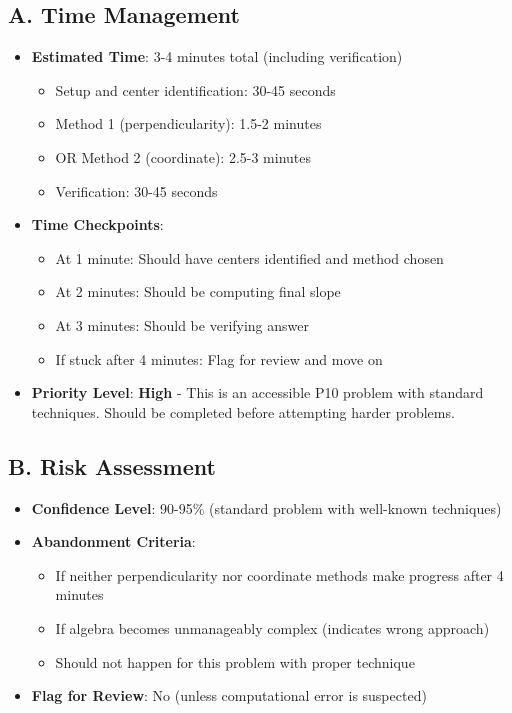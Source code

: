 \documentclass[12pt]{article}
\begin{document}
\begin{competitionbox}
\subsection*{A. Time Management}
\begin{itemize}[leftmargin=*]
    \item \textbf{Estimated Time}: 3-4 minutes total (including verification)
    \begin{itemize}
        \item Setup and center identification: 30-45 seconds
        \item Method 1 (perpendicularity): 1.5-2 minutes
        \item OR Method 2 (coordinate): 2.5-3 minutes
        \item Verification: 30-45 seconds
    \end{itemize}
    \item \textbf{Time Checkpoints}: 
    \begin{itemize}
        \item At 1 minute: Should have centers identified and method chosen
        \item At 2 minutes: Should be computing final slope
        \item At 3 minutes: Should be verifying answer
        \item If stuck after 4 minutes: Flag for review and move on
    \end{itemize}
    \item \textbf{Priority Level}: \textbf{High} - This is an accessible P10 problem with standard techniques. Should be completed before attempting harder problems.
\end{itemize}

\subsection*{B. Risk Assessment}
\begin{itemize}[leftmargin=*]
    \item \textbf{Confidence Level}: 90-95\% (standard problem with well-known techniques)
    \item \textbf{Abandonment Criteria}: 
    \begin{itemize}
        \item If neither perpendicularity nor coordinate methods make progress after 4 minutes
        \item If algebra becomes unmanageably complex (indicates wrong approach)
        \item Should not happen for this problem with proper technique
    \end{itemize}
    \item \textbf{Flag for Review}: No (unless computational error is suspected)
\end{itemize}


\end{competitionbox}
\end{document}
